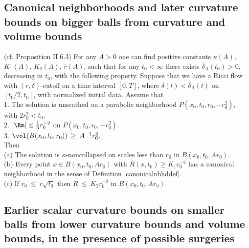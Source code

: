 \subsection{Canonical neighborhoods and later curvature bounds on bigger balls from curvature and volume bounds}

\begin{proposition}
  \label{prop:kl-canonical-neighborhoods-later-curvature-bounds-bigger-balls-from-curvatu-existence-canonical-neighborhoods}

(cf. Proposition II.6.3)
For any $A > 0$ one can find positive constants $\kappa(A)$, $K_1(A)$, $K_2(A)$,
$\overline{r}(A)$,
such that for any $t_0 < \infty$
there exists $\overline{\delta}_{A}(t_0)
> 0$, decreasing in $t_0$, with the following property.  Suppose that
we have a Ricci flow with $(r, \delta)$-cutoff on a time interval
$[0, T]$, where $\delta(t) < \overline{\delta}_A(t)$ on $[t_0/2, t_0]$, with
normalized initial data.  Assume that \\
1. The solution is unscathed on a parabolic neighborhood
$P(x_0, t_0, r_0, -r_0^2)$, with $2r_0^2 < t_0$. \\
2.
$|\Rm| \le \frac13 r_0^{-2}$
on $P(x_0, t_0, r_0, -r_0^2)$. \\
3. $\vol(B(x_0, t_0, r_0)) \: \ge \: A^{-1} r_0^3$.\\

Then\\
(a) The solution is $\kappa$-noncollapsed on scales less than $r_0$
in $B(x_0, t_0, Ar_0)$.\\
(b) Every point $x \in B(x_0, t_0, Ar_0)$ with $R(x, t_0) \ge K_1 r_0^{-2}$
has a canonical neighborhood in the sense of
Definition \ref{canonicalnbhddef}.\\
(c) If $r_0 \: \le \: \overline{r} \sqrt{t_0}$ then $R \: \le \: K_2
r_0^{-2}$ in $B(x_0, t_0, Ar_0)$.
\end{proposition}

\subsection{Earlier scalar curvature bounds on smaller balls from lower curvature bounds and volume bounds, in the presence of possible surgeries}

